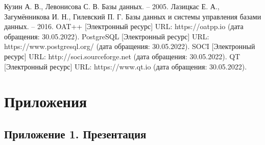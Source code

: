 \def\bibname{Список использованных источников}
\begin{thebibliography}{9}
  \label{cha:biblio}  
   Кузин А. В., Левонисова С. В. Базы данных. – 2005.
   Лазицкас Е. А., Загумённикова И. Н., Гилевский П. Г. Базы данных и системы управления базами данных. – 2016.
   OAT++ [Электронный ресурс] URL: https://oatpp.io (дата обращения: 30.05.2022).
   PostgreSQL [Электронный ресурс] URL: https://www.postgresql.org/ (дата обращения: 30.05.2022).
   SOCI [Электронный ресурс] URL: http://soci.sourceforge.net (дата обращения: 30.05.2022).
   QT [Электронный ресурс] URL: https://www.qt.io (дата обращения: 30.05.2022).
\end{thebibliography}

\chapter*{Приложения}
\section*{Приложение 1. Презентация}
